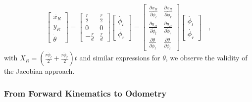 \begin{equation}
\left[\begin{array}{c} \dot{x_R}\\\dot{y_R}\\\dot{\theta}\end{array}\right]=\left[\begin{array}{cc}
\frac{r}{2} & \frac{r}{2}\\
0 & 0 \\
-\frac{r}{d} & \frac{r}{d} \end{array}\right]
\left[\begin{array}{c}\dot{\phi_l}\\\dot{\phi_r}\end{array}\right]
=
\left[\begin{array}{cc}
\frac{\partial{x_R}}{\partial{\dot{\phi}_l}} & \frac{\partial{x_R}}{\partial{\dot{\phi}_r}}\\\frac{\partial{y_R}}{\partial{\dot{\phi}_l}} & \frac{\partial{y_R}}{\partial{\dot{\phi}_r}}\\\frac{\partial{\theta}}{\partial{\dot{\phi}_l}} & \frac{\partial{\theta}}{\partial{\dot{\phi}_l}} \end{array}\right]
\left[\begin{array}{c}
\dot{\phi_l}\\\dot{\phi_r}
\end{array}\right]\quad,
\end{equation}
with $X_R=\left(\frac{r\dot{\phi}_l}{2}+\frac{r\dot{\phi}_r}{2}\right)t$ and similar expressions for $\theta$, we observe the validity of the Jacobian approach.

\subsubsection{From Forward Kinematics to Odometry}

